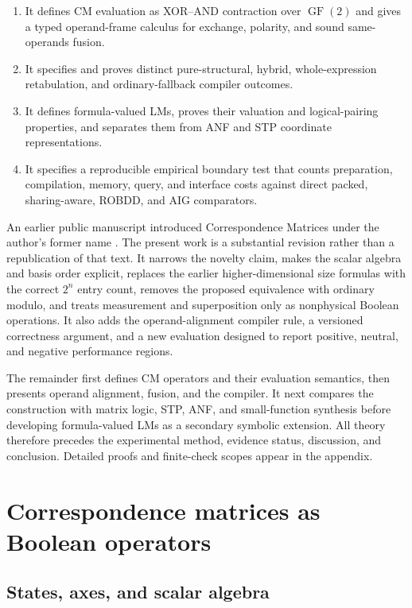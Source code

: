 \documentclass[11pt]{article}
\newcommand{\GFtwo}{\operatorname{GF}(2)}
\begin{document}
\begin{enumerate}
  \item It defines CM evaluation as XOR--AND contraction over $\GFtwo$ and gives
  a typed operand-frame calculus for exchange, polarity, and sound
  same-operands fusion.
  \item It specifies and proves distinct pure-structural, hybrid,
  whole-expression retabulation, and ordinary-fallback compiler outcomes.
  \item It defines formula-valued LMs, proves their valuation and
  logical-pairing properties, and separates them from ANF and STP coordinate
  representations.
  \item It specifies a reproducible empirical boundary test that counts
  preparation, compilation, memory, query, and interface costs against direct
  packed, sharing-aware, ROBDD, and AIG comparators.
\end{enumerate}

An earlier public manuscript introduced Correspondence Matrices under the
author's former name \citep{droncheff2018}. The present work is a substantial
revision rather than a republication of that text. It narrows the novelty
claim, makes the scalar algebra and basis order explicit, replaces the earlier
higher-dimensional size formulas with the correct $2^n$ entry count, removes
the proposed equivalence with ordinary modulo, and treats measurement and
superposition only as nonphysical Boolean operations. It also adds the
operand-alignment compiler rule, a versioned correctness argument, and a new
evaluation designed to report positive, neutral, and negative performance
regions.

The remainder first defines CM operators and their evaluation semantics, then
presents operand alignment, fusion, and the compiler. It next compares the
construction with matrix logic, STP, ANF, and small-function synthesis before
developing formula-valued LMs as a secondary symbolic extension. All theory
therefore precedes the experimental method, evidence status, discussion, and
conclusion. Detailed proofs and finite-check scopes appear in the appendix.

\section{Correspondence matrices as Boolean operators}
\label{sec:cm-operators}

\subsection{States, axes, and scalar algebra}
\end{document}
